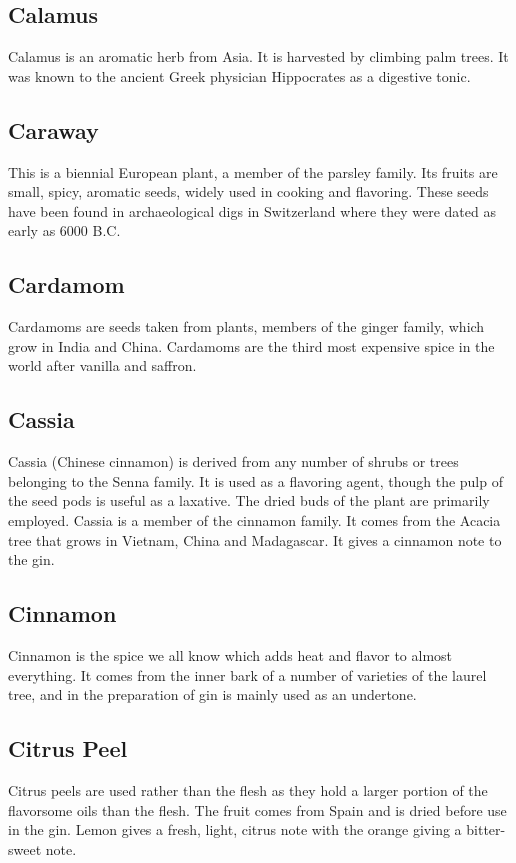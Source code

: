 \subsection*{Calamus} Calamus is an aromatic herb from Asia. It
is harvested by climbing palm trees. It was known to the ancient Greek
physician Hippocrates as a digestive tonic.  

\subsection*{Caraway} This is a biennial European plant, a member
of the parsley family. Its fruits are small, spicy, aromatic seeds, widely used
in cooking and flavoring. These seeds have been found in archaeological digs in
Switzerland where they were dated as early as 6000 B.C.

\subsection*{Cardamom} Cardamoms are seeds taken from plants,
members of the ginger family, which grow in India and China. Cardamoms are the
third most expensive spice in the world after vanilla and saffron.

\subsection*{Cassia} Cassia
(Chinese cinnamon) is derived from any number of shrubs or trees belonging to
the Senna family. It is used as a flavoring agent, though the pulp of the seed
pods is useful as a laxative.  The dried buds of the plant are primarily
employed. Cassia is a member of the cinnamon family. It comes from the Acacia
tree that grows in Vietnam, China and Madagascar. It gives a cinnamon note to
the gin.

\subsection*{Cinnamon} Cinnamon is the spice we all know which
adds heat and flavor to almost everything. It comes from the inner bark of a
number of varieties of the laurel tree, and in the preparation of gin is mainly
used as an undertone. 

\subsection*{Citrus Peel} Citrus peels are used rather than
the flesh as they hold a larger portion of the flavorsome oils than the flesh.
The fruit comes from Spain and is dried before use in the gin. Lemon gives a
fresh, light, citrus note with the orange giving a bitter-sweet note.

